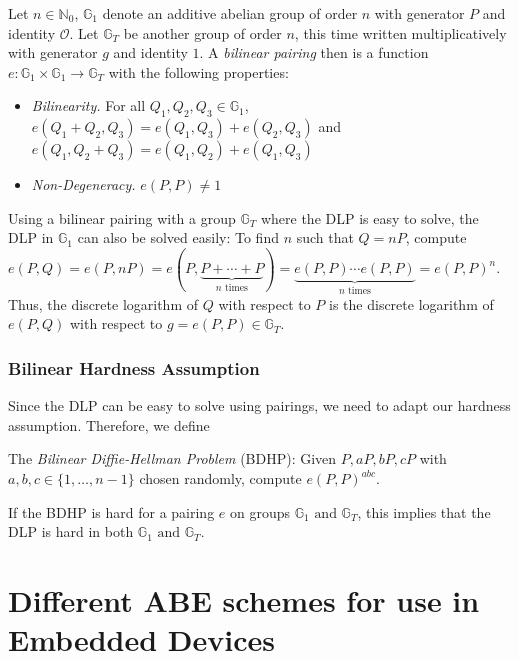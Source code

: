 Let $n \in \mathbb{N}_0$, $\mathbb{G}_1$ denote an additive abelian group of order $n$ with generator $P$ and identity $\mathcal{O}$. 
Let $\mathbb{G}_T$ be another group of order $n$, this time written multiplicatively with generator $g$ and identity $1$.
A \emph{bilinear pairing} then is a function $e: \mathbb{G}_1 \times \mathbb{G}_1 \rightarrow \mathbb{G}_T$ with the following properties:
\begin{itemize}
    \item \emph{Bilinearity.} For all $Q_1, Q_2, Q_3 \in \mathbb{G}_1$, $e(Q_1+Q_2, Q_3) = e(Q_1,Q_3)+e(Q_2,Q_3)$ and $e(Q_1, Q_2+Q_3)=e(Q_1,Q_2)+e(Q_1,Q_3)$
    \item \emph{Non-Degeneracy.} $e(P,P) \neq 1$
\end{itemize}

Using a bilinear pairing with a group $\mathbb{G}_T$ where the DLP is easy to solve, the DLP in $\mathbb{G}_1$ can also be solved easily:
To find $n$ such that $Q = nP$, compute $e(P,Q) = e(P, nP) = e(P, \underbrace{P+\cdots+P}_{n \text{ times}}) = \underbrace{e(P,P) \cdots e(P,P)}_{n \text{ times}} = e(P,P)^n$.
Thus, the discrete logarithm of $Q$ with respect to $P$ is the discrete logarithm of $e(P,Q)$ with respect to $g = e(P,P) \in \mathbb{G}_T$.~\cite{menezes_introduction_2009}

\subsubsection{Bilinear Hardness Assumption}

Since the DLP can be easy to solve using pairings, we need to adapt our hardness assumption. Therefore, we define

The \emph{Bilinear Diffie-Hellman Problem} (BDHP): Given $P, aP, bP, cP$ with $a,b,c \in \{1,\dots,n-1\}$ chosen randomly, compute $e(P, P)^{abc}$.~\cite{menezes_introduction_2009}

If the BDHP is hard for a pairing $e$ on groups $\mathbb{G}_1 \text{ and } \mathbb{G}_T$, this implies that the DLP is hard in both $\mathbb{G}_1 \text{ and } \mathbb{G}_T$.~\cite{menezes_introduction_2009}

\section{Different ABE schemes for use in Embedded Devices}\label{sec:concrete-schemes} 